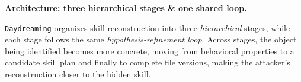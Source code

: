 \documentclass[letterpaper,twocolumn,10pt]{article}
\newcommand{\method}{\texttt{Daydreaming}\xspace}
\newcommand{\paragraphtitle}[1]{%
  \vspace{5pt}\noindent\textbf{#1.}%
}
\begin{document}

\paragraphtitle{Architecture: three hierarchical stages \& one shared loop}
\method organizes skill reconstruction into three \emph{hierarchical} stages, while each stage follows the same \emph{hypothesis-refinement loop}. Across stages, the object being identified becomes more concrete, moving from behavioral properties to a candidate skill plan and finally to complete file versions, making the attacker’s reconstruction closer to the hidden skill.
\end{document}
